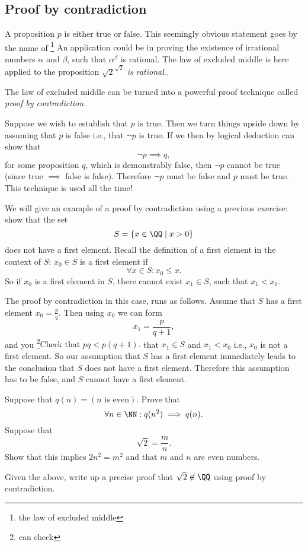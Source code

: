 \documentclass{article}
\begin{document}
\subsection{Proof by contradiction}

A proposition $p$ is either true or false. This seemingly obvious statement
goes by the name of \footnote{the law of excluded middle}{
An application could be in proving the existence of irrational numbers $\alpha$ and $\beta$, such that
$\alpha^\beta$ is rational. The law of excluded middle is here applied to the proposition
\emph{$\sqrt{2}^{\sqrt{2}}$ is rational}.}.


The law of excluded middle can be turned
into a powerful proof technique called \emph{proof by contradiction}.

Suppose we wish to establish that $p$ is true. Then we turn things upside down by
assuming that $p$ is false i.e., that $\neg p$ is true. If we then
by logical deduction can show that
$$
\neg p \implies q,
$$
for some proposition $q$, which is demonstrably false, then $\neg p$ cannot be true (since
true $\implies$ false is false). Therefore $\neg p$
must be false and $p$ must be true. This technique is used all the time!

\beginshex
We will give an example of a proof by contradiction using a previous exercise: show that
the set
$$
S = \{x\in \QQ \mid x > 0\}
$$
does not have a first element. Recall the definition of a first element in
the context of $S$: $x_0\in S$ is a first element if 
$$
\forall x\in S: x_0 \leq x.
$$
So if $x_0$ is a first element in $S$, there cannot exist $x_1\in S$, such that
$x_1 < x_0$.

The proof by contradiction  in this case, runs as follows. Assume that $S$
has a first element $x_0 = \frac{p}{q}$. Then using $x_0$ we can form
$$
x_1 = \frac{p}{q+1},
$$
and you \footnote{can check}{Check that $p q < p(q+1)$.} that $x_1\in S$ and $x_1 < x_0$ i.e., $x_0$ is not a first
element. So our assumption that $S$ has a first element immediately leads
to the conclusion that $S$ does not have a first element. Therefore this
assumption has to be false, and $S$ cannot have a first element.
\endshex

\beginshex
Suppose that $q(n) = (n \text{ is even})$. Prove that
$$
\forall n\in \NN: q(n^2) \implies q(n).
$$
Suppose that
$$
\sqrt{2} = \frac{m}{n}.
$$
Show that this implies $2 n^2 = m^2$ and that $m$ and $n$ are even numbers.

Given the above, write up a precise proof that $\sqrt{2}\not\in \QQ$
using proof by contradiction.
\end{document}
